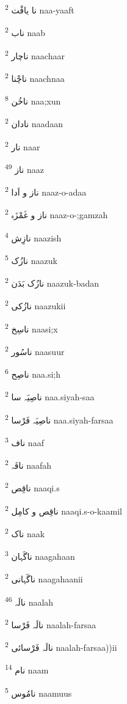 \documentclass[12pt]{article}
\begin{document}
\begin{RTL}
\begin{multicols}{5}
{\ur نا یافْت}   \textsuperscript{2} naa-yaaft

{\ur ناب}   \textsuperscript{2} naab

{\ur ناچار}   \textsuperscript{2} naachaar

{\ur ناچْنا}   \textsuperscript{2} naachnaa

{\ur ناخُن}   \textsuperscript{8} naa;xun

{\ur نادان}   \textsuperscript{2} naadaan

{\ur نار}   \textsuperscript{2} naar

{\ur ناز}   \textsuperscript{49} naaz

{\ur ناز و اَدا}   \textsuperscript{2} naaz-o-adaa

{\ur ناز و غَمْزَہ}   \textsuperscript{2} naaz-o-;gamzah

{\ur نازِش}   \textsuperscript{4} naazish

{\ur نازُک}   \textsuperscript{5} naazuk

{\ur نازُک بَدَن}   \textsuperscript{2} naazuk-badan

{\ur نازُکی}   \textsuperscript{2} naazukii

{\ur ناسِخ}   \textsuperscript{2} naasi;x

{\ur ناسُور}   \textsuperscript{2} naasuur

{\ur ناصِح}   \textsuperscript{6} naa.si;h

{\ur ناصِیَہ سا}   \textsuperscript{2} naa.siyah-saa

{\ur ناصِیَہ فَرْسا}   \textsuperscript{2} naa.siyah-farsaa

{\ur ناف}   \textsuperscript{3} naaf

{\ur نافَہ}   \textsuperscript{2} naafah

{\ur ناقِص}   \textsuperscript{2} naaqi.s

{\ur ناقِص و کامِل}   \textsuperscript{2} naaqi.s-o-kaamil

{\ur ناک}   \textsuperscript{2} naak

{\ur ناگَہان}   \textsuperscript{3} naagahaan

{\ur ناگَہانی}   \textsuperscript{2} naagahaanii

{\ur نالَہ}   \textsuperscript{46} naalah

{\ur نالَہ فَرْسا}   \textsuperscript{2} naalah-farsaa

{\ur نالَہ فَرْسائی}   \textsuperscript{2} naalah-farsaa))ii

{\ur نام}   \textsuperscript{14} naam

{\ur نامُوس}   \textsuperscript{5} naamuus


\end{multicols}
\end{RTL}
\end{document}
